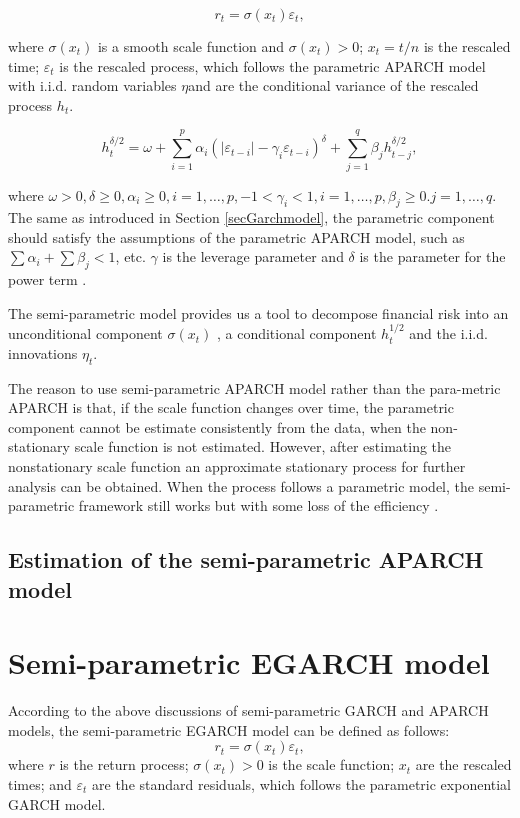 \begin{equation}
r_{t} = \sigma(x_t)\varepsilon_{t},
\end{equation}

where $\sigma(x_t)$ is a smooth scale function and $\sigma(x_t) >0$; $x_t = t/n$ is the rescaled time;  $\varepsilon_{t}$ is the rescaled process, which follows the parametric APARCH model with i.i.d. random variables $\eta $and are the conditional variance of the rescaled process $h_{t}$.
    

\begin{equation}
h_{t}^{\delta/2} = \omega + \sum_{i=1}^{p} \alpha_{i}(|\varepsilon_{t-i}|-\gamma_{i}\varepsilon_{t-i})^{\delta} + \sum_{j=1}^{q}\beta_{j}h_{t-j}^{\delta/2},
\end{equation}

where $\omega>0, \delta\geq0, \alpha_{i}\geq0, i=1, \ldots, p, -1<\gamma_{i}<1, i=1, \ldots, p, \beta_{j}\geq0.j=1, \ldots, q$.
The same as introduced in Section \ref{secGarchmodel}, the parametric component should satisfy the assumptions of the parametric APARCH model, such as $\sum\alpha_{i} + \sum\beta_{j}<1 $, etc. $\gamma$ is the leverage parameter and $\delta$  is the parameter for the power term \citep{Ding1993}.

The semi-parametric model provides us a tool to decompose financial risk into an unconditional component $\sigma(x_t)$ , a conditional component $h_{t}^{1/2}$  and the i.i.d. innovations $\eta_{t}$.

The reason to use semi-parametric APARCH model rather than the para-metric APARCH is that, if the scale function changes over time, the parametric component cannot be estimate consistently from the data, when the non-stationary scale function is not estimated. However, after estimating the nonstationary scale function an approximate stationary process for further analysis can be obtained. When the process follows a parametric model, the semi-parametric framework still works but with some loss of the efficiency \citep{FengYuanhua;Sun2013}.

\subsection{ Estimation of the semi-parametric APARCH model}
\section{Semi-parametric EGARCH model}
According to the above discussions of semi-parametric GARCH and APARCH models, the semi-parametric EGARCH model can be defined as follows:
\begin{equation}
r_{t} = \sigma(x_{t})\varepsilon_{t},
\end{equation}
where $r$ is the return process; $\sigma(x_{t})>0$ is the scale function; $x_{t}$  are the rescaled times; and  $\varepsilon_{t}$ are the standard residuals, which follows the parametric exponential GARCH model.

